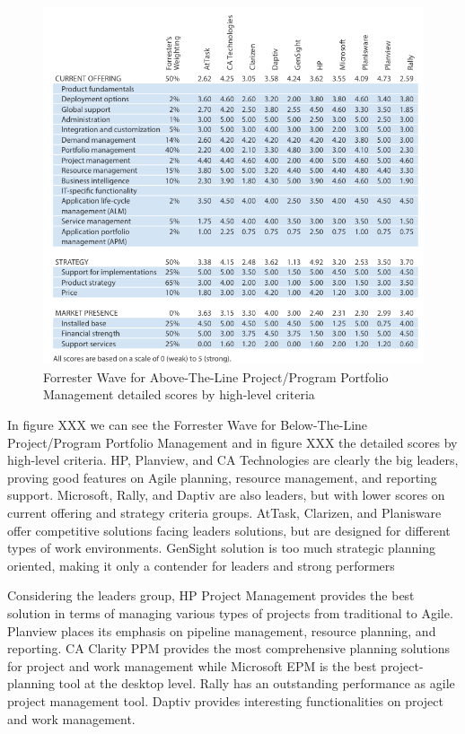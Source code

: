 \begin{figure}
\centering
\includegraphics{img/AboveLineScores.png}
\caption{Forrester Wave for Above-The-Line Project/Program Portfolio Management detailed scores by high-level criteria}
\end{figure}


In figure XXX we can see the Forrester Wave for Below-The-Line Project/Program Portfolio Management and in figure XXX the detailed scores by high-level criteria. HP, Planview, and CA Technologies are clearly the big leaders, proving good features on Agile planning, resource management, and reporting support. Microsoft, Rally, and Daptiv are also leaders, but with lower scores on current offering and strategy criteria groups. AtTask, Clarizen, and Planisware offer competitive solutions facing leaders solutions, but are designed for different types of work environments. GenSight solution is too much strategic planning oriented, making it only a contender for leaders and strong performers\par
Considering the leaders group, HP Project Management provides the best solution in terms of managing various types of projects from traditional to Agile. Planview places its emphasis on pipeline management, resource planning, and reporting. CA Clarity PPM provides the most comprehensive planning solutions for project and work management while Microsoft EPM is the best project-planning tool at the desktop level. Rally has an outstanding performance as agile project management tool. Daptiv provides interesting functionalities on project and work management.\par



